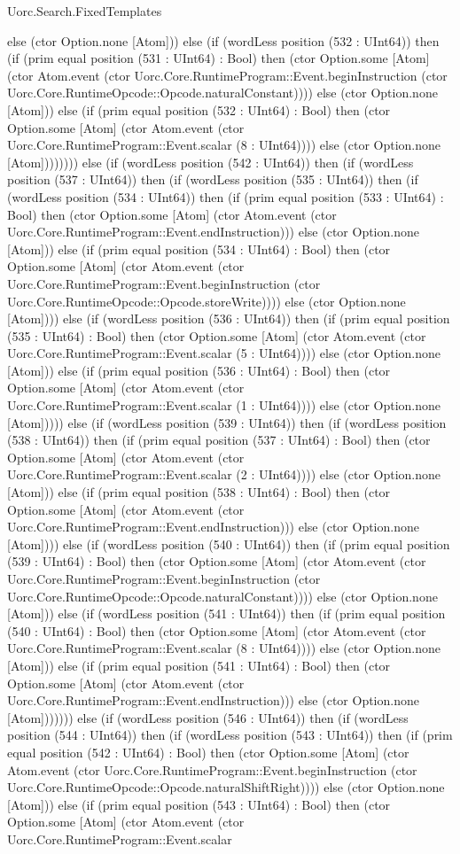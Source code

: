 \begin{lexlean}{Uorc.Search.FixedTemplates}
\begin{semanticmodule}
{else (ctor Option.none [Atom])) else (if (wordLess position (532 : UInt64)) then (if (prim equal position (531 : UInt64) : Bool) then (ctor Option.some [Atom] (ctor Atom.event (ctor Uorc.Core.RuntimeProgram::Event.beginInstruction (ctor Uorc.Core.RuntimeOpcode::Opcode.naturalConstant)))) else (ctor Option.none [Atom])) else (if (prim equal position (532 : UInt64) : Bool) then (ctor Option.some [Atom] (ctor Atom.event (ctor Uorc.Core.RuntimeProgram::Event.scalar (8 : UInt64)))) else (ctor Option.none [Atom]))))))) else (if (wordLess position (542 : UInt64)) then (if (wordLess position (537 : UInt64)) then (if (wordLess position (535 : UInt64)) then (if (wordLess position (534 : UInt64)) then (if (prim equal position (533 : UInt64) : Bool) then (ctor Option.some [Atom] (ctor Atom.event (ctor Uorc.Core.RuntimeProgram::Event.endInstruction))) else (ctor Option.none [Atom])) else (if (prim equal position (534 : UInt64) : Bool) then (ctor Option.some [Atom] (ctor Atom.event (ctor Uorc.Core.RuntimeProgram::Event.beginInstruction (ctor Uorc.Core.RuntimeOpcode::Opcode.storeWrite)))) else (ctor Option.none [Atom]))) else (if (wordLess position (536 : UInt64)) then (if (prim equal position (535 : UInt64) : Bool) then (ctor Option.some [Atom] (ctor Atom.event (ctor Uorc.Core.RuntimeProgram::Event.scalar (5 : UInt64)))) else (ctor Option.none [Atom])) else (if (prim equal position (536 : UInt64) : Bool) then (ctor Option.some [Atom] (ctor Atom.event (ctor Uorc.Core.RuntimeProgram::Event.scalar (1 : UInt64)))) else (ctor Option.none [Atom])))) else (if (wordLess position (539 : UInt64)) then (if (wordLess position (538 : UInt64)) then (if (prim equal position (537 : UInt64) : Bool) then (ctor Option.some [Atom] (ctor Atom.event (ctor Uorc.Core.RuntimeProgram::Event.scalar (2 : UInt64)))) else (ctor Option.none [Atom])) else (if (prim equal position (538 : UInt64) : Bool) then (ctor Option.some [Atom] (ctor Atom.event (ctor Uorc.Core.RuntimeProgram::Event.endInstruction))) else (ctor Option.none [Atom]))) else (if (wordLess position (540 : UInt64)) then (if (prim equal position (539 : UInt64) : Bool) then (ctor Option.some [Atom] (ctor Atom.event (ctor Uorc.Core.RuntimeProgram::Event.beginInstruction (ctor Uorc.Core.RuntimeOpcode::Opcode.naturalConstant)))) else (ctor Option.none [Atom])) else (if (wordLess position (541 : UInt64)) then (if (prim equal position (540 : UInt64) : Bool) then (ctor Option.some [Atom] (ctor Atom.event (ctor Uorc.Core.RuntimeProgram::Event.scalar (8 : UInt64)))) else (ctor Option.none [Atom])) else (if (prim equal position (541 : UInt64) : Bool) then (ctor Option.some [Atom] (ctor Atom.event (ctor Uorc.Core.RuntimeProgram::Event.endInstruction))) else (ctor Option.none [Atom])))))) else (if (wordLess position (546 : UInt64)) then (if (wordLess position (544 : UInt64)) then (if (wordLess position (543 : UInt64)) then (if (prim equal position (542 : UInt64) : Bool) then (ctor Option.some [Atom] (ctor Atom.event (ctor Uorc.Core.RuntimeProgram::Event.beginInstruction (ctor Uorc.Core.RuntimeOpcode::Opcode.naturalShiftRight)))) else (ctor Option.none [Atom])) else (if (prim equal position (543 : UInt64) : Bool) then (ctor Option.some [Atom] (ctor Atom.event (ctor Uorc.Core.RuntimeProgram::Event.scalar }
\end{semanticmodule}
\end{lexlean}
